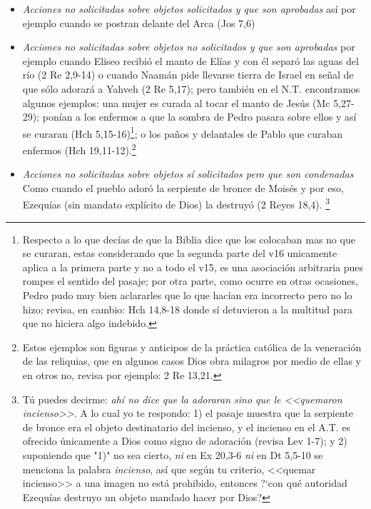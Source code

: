 \documentclass{article}
\begin{document}
\begin{itemize}
\item \emph{Acciones no solicitadas sobre objetos solicitados y que son aprobadas} as\'{i} por ejemplo cuando se postran delante del Arca (Jos 7,6)

\item \emph{Acciones no solicitadas sobre objetos no solicitados y que son aprobadas} por ejemplo cuando Eliseo recibi\'o el manto de El\'{i}as y con \'el separ\'o las aguas del r\'{i}o (2 Re 2,9-14) o cuando Naam\'an pide llevarse tierra de Israel en se\~nal de que s\'olo adorar\'a a Yahveh (2 Re 5,17); pero tambi\'en en el N.T. encontramos algunos ejemplos: una mujer es curada al tocar el manto de Jes\'us (Mc 5,27-29); pon\'{i}an a los enfermos a que la sombra de Pedro pasara sobre ellos y as\'{i} se curaran (Hch 5,15-16)\footnote{Respecto a lo que dec\'{i}as de que la Biblia dice que los colocaban mas no que se curaran, estas considerando que la segunda parte del v16 unicamente aplica a la primera parte y no a todo el v15, es una asociaci\'on arbitraria pues rompes el sentido del pasaje; por otra parte, como ocurre en otras ocasiones, Pedro pudo muy bien aclararles que lo que hac\'{i}an era incorrecto pero no lo hizo; revisa, en cambio: Hch 14,8-18 donde sí detuvieron a la multitud para que no hiciera algo indebido.}; o los paños y delantales de Pablo que curaban enfermos (Hch 19,11-12).\footnote{Estos ejemplos son figuras y anticipos de la pr\'actica cat\'olica de la veneraci\'on de las reliquias, que en algunos casos Dios obra milagros por medio de ellas y en otros no, revisa por ejemplo: 2 Re 13,21.}

\item \emph{Acciones no solicitadas sobre objetos s\'{i} solicitados pero que son condenadas} Como cuando el pueblo ador\'o la serpiente de bronce de Mois\'es y por eso, Ezequ\'{i}as (sin mandato expl\'{i}cito de Dios) la destruy\'o (2 Reyes 18,4).%
    \footnote{T\'u puedes decirme: \emph{ah\'{i} no dice que la adoraran sino que le <<quemaron incienso>>}. A lo cual yo te respondo: 1) el pasaje muestra que la serpiente de bronce era el objeto destinatario del incienso, y el incienso en el A.T. es ofrecido \'unicamente a Dios como signo de adoraci\'on (revisa Lev 1-7); y 2) suponiendo que "1)" no sea cierto, \emph{ni} en Ex 20,3-6 \emph{ni} en Dt 5,5-10 se menciona la palabra \emph{incienso}, as\'{i} que seg\'un tu criterio, <<quemar incienso>> a una imagen no est\'a prohibido, entonces ?`con qu\'e autoridad Ezequ\'{i}as destruyo un objeto mandado hacer por Dios?}
\end{itemize}
\end{document}
